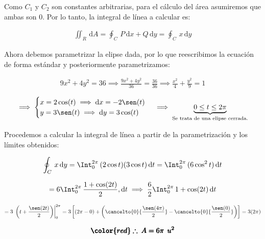 \documentclass[12pt]{article}
\begin{document}
\noindent Como $C_1$ y $C_2$ son constantes arbitrarias, para el cálculo del área asumiremos que ambas son 0. Por lo tanto, la integral de línea a calcular es:

\begin{align*}
	\iint_R\,\mathrm{d}A = \oint_C\, P\,\mathrm{d}x + Q\,\mathrm{d}y = \oint_C\, x\, \mathrm{d}y
\end{align*}

\noindent Ahora debemos parametrizar la elipse dada, por lo que reescribimos la ecuación de forma estándar y posteriormente parametrizamos:

\begin{align*}
	9x^2 + 4y^2 = 36 \implies \frac{9x^2 + 4y^2}{36} = \frac{36}{36} \implies \frac{x^2}{4} + \frac{y^2}{9} = 1
\end{align*}

\begin{align*}
	\implies \begin{cases}
		x = 2\cos(t) \implies \mathrm{d}x = -2\sen(t)\\
		y = 3\sen(t) \implies \mathrm{d}y = 3\cos(t)\\
	\end{cases} \implies \underbrace{0 \leq t \leq 2\pi}_{\text{Se trata de una elipse cerrada.}}
\end{align*}

\noindent Procedemos a calcular la integral de línea a partir de la parametrización y los límites obtenidos:

\begin{align*}
	\oint_C\, x\,\mathrm{d}y = \Int_{0}^{2\pi}\, (2\cos t)(3\cos t)\,\mathrm{d}t = \Int_{0}^{2\pi}\, (6\cos^2 t)\,\mathrm{d}t
\end{align*}

\begin{align*}
	= 6\Int_{0}^{2\pi}\, \frac{1+\cos(2t)}{2},\mathrm{d}t
	\implies \frac{6}{2}\Int_{0}^{2\pi}\, 1+\cos(2t)\,\mathrm{d}t
\end{align*}

\begin{align*}
	= 3\,\left.\left(t + \frac{\sen(2t)}{2}\right)\right|_{0}^{2\pi} = 3\left[ \left(2\pi - 0\right) + \left( \cancelto{0}{\frac{\sen(4\pi)}{2}} - \cancelto{0}{\frac{\sen(0)}{2}} \right) \right] = 3(2\pi)
\end{align*}

\begin{align*}
	\pmb{\color{red} \therefore\: A = 6\pi\: \: u^2}
\end{align*}
\end{document}
